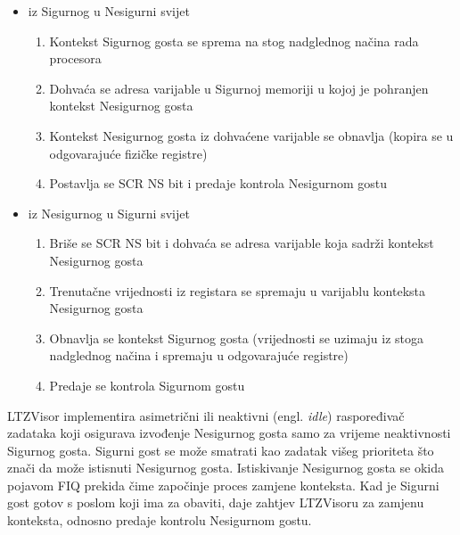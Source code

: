 \documentclass[times, utf8, diplomski, numeric]{fer}
\begin{document}
\begin{itemize}
  \item{iz Sigurnog u Nesigurni svijet}
      \begin{enumerate}
        \item{Kontekst Sigurnog gosta se sprema na stog nadglednog načina rada procesora}
        \item{Dohvaća se adresa varijable u Sigurnoj memoriji u kojoj je pohranjen kontekst Nesigurnog gosta}
        \item{Kontekst Nesigurnog gosta iz dohvaćene varijable se obnavlja (kopira se u odgovarajuće fizičke registre)}
        \item{Postavlja se SCR NS bit i predaje kontrola Nesigurnom gostu}
      \end{enumerate}
  \item{iz Nesigurnog u Sigurni svijet}
      \begin{enumerate}
        \item{Briše se SCR NS bit i dohvaća se adresa varijable koja sadrži kontekst Nesigurnog gosta}
        \item{Trenutačne vrijednosti iz registara se spremaju u varijablu konteksta Nesigurnog gosta}
        \item{Obnavlja se kontekst Sigurnog gosta (vrijednosti se uzimaju iz stoga nadglednog načina i spremaju u odgovarajuće
        registre)}
        \item{Predaje se kontrola Sigurnom gostu}
      \end{enumerate}
\end{itemize}
LTZVisor implementira asimetrični ili neaktivni (engl. \textit{idle}) raspoređivač zadataka koji osigurava izvođenje Nesigurnog
gosta samo za vrijeme neaktivnosti Sigurnog gosta. Sigurni gost se može smatrati kao zadatak višeg prioriteta što znači
da može istisnuti Nesigurnog gosta. Istiskivanje Nesigurnog gosta se okida pojavom FIQ prekida čime započinje proces zamjene
konteksta. Kad je Sigurni gost gotov s poslom koji ima za obaviti, daje zahtjev LTZVisoru za zamjenu konteksta, odnosno predaje
kontrolu Nesigurnom gostu.
\end{document}
